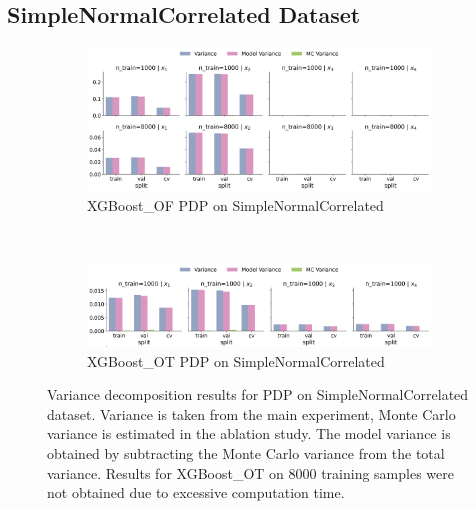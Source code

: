 \documentclass[runningheads]{llncs}
\begin{document}
\subsection{SimpleNormalCorrelated Dataset}
\begin{figure}[htbp]
    \centering
    \begin{subfigure}[b]{0.75\textwidth}
        \includegraphics[width=\textwidth]{img/SNC-all/variance_decomposition_pdp_XGBoost_OF.png}
        \caption{XGBoost\_OF PDP on SimpleNormalCorrelated}
    \end{subfigure}
    \\[10pt]
    \vfill
    \begin{subfigure}[b]{0.75\textwidth}
        \includegraphics[width=\textwidth]{img/SNC-all/variance_decomposition_pdp_XGBoost_OT.png}
        \caption{XGBoost\_OT PDP on SimpleNormalCorrelated}
    \end{subfigure}
    \caption{Variance decomposition results for PDP on SimpleNormalCorrelated dataset. Variance is taken from the
        main experiment, Monte Carlo variance is estimated in the ablation study. The model variance is
        obtained by subtracting the Monte Carlo variance from the total variance. Results for XGBoost\_OT
        on 8000 training samples were not obtained due to excessive computation time.}
    \label{fig:pdp-variance-decomp-snc}  %
\end{figure}
\end{document}
